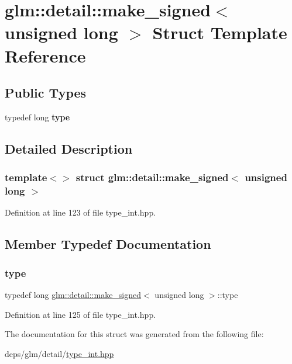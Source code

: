 \hypertarget{structglm_1_1detail_1_1make__signed_3_01unsigned_01long_01_4}{}\section{glm\+:\+:detail\+:\+:make\+\_\+signed$<$ unsigned long $>$ Struct Template Reference}
\label{structglm_1_1detail_1_1make__signed_3_01unsigned_01long_01_4}
\subsection*{Public Types}
\begin{DoxyCompactItemize}
\item 
\mbox{\label{structglm_1_1detail_1_1make__signed_3_01unsigned_01long_01_4_a055abdf7ba75d133a9784c2749f2336f}} 
typedef long {\bfseries type}
\end{DoxyCompactItemize}


\subsection{Detailed Description}
\subsubsection*{template$<$$>$\newline
struct glm\+::detail\+::make\+\_\+signed$<$ unsigned long $>$}



Definition at line 123 of file type\+\_\+int.\+hpp.



\subsection{Member Typedef Documentation}
\mbox{\label{structglm_1_1detail_1_1make__signed_3_01unsigned_01long_01_4_a055abdf7ba75d133a9784c2749f2336f}} 
\subsubsection{\texorpdfstring{type}{type}}
{\footnotesize\ttfamily typedef long \hyperlink{structglm_1_1detail_1_1make__signed}{glm\+::detail\+::make\+\_\+signed}$<$ unsigned long $>$\+::type}



Definition at line 125 of file type\+\_\+int.\+hpp.



The documentation for this struct was generated from the following file\+:\begin{DoxyCompactItemize}
\item 
deps/glm/detail/\hyperlink{type__int_8hpp}{type\+\_\+int.\+hpp}\end{DoxyCompactItemize}
